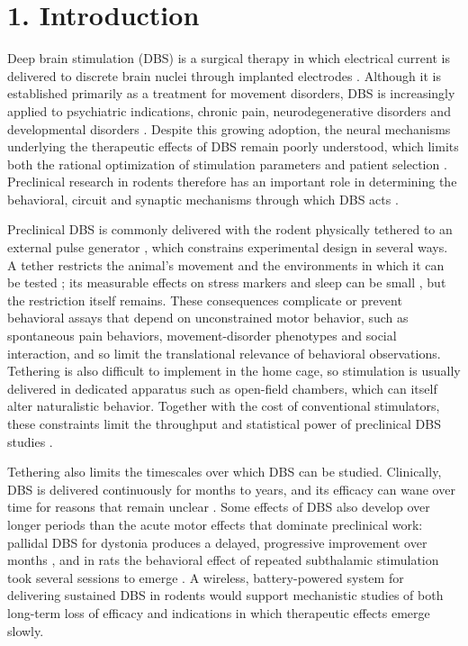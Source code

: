 \section{1. Introduction}\label{introduction}

Deep brain stimulation (DBS) is a surgical therapy in which electrical current is delivered to discrete brain nuclei through implanted electrodes \citep{lozano2019}. Although it is established primarily as a treatment for movement disorders, DBS is increasingly applied to psychiatric indications, chronic pain, neurodegenerative disorders and developmental disorders \citep{lozano2019,krauss2021,knotkova2021}. Despite this growing adoption, the neural mechanisms underlying the therapeutic effects of DBS remain poorly understood, which limits both the rational optimization of stimulation parameters and patient selection \citep{murphy2021}. Preclinical research in rodents therefore has an important role in determining the behavioral, circuit and synaptic mechanisms through which DBS acts \citep{creed2015,creed2018}.

Preclinical DBS is commonly delivered with the rodent physically tethered to an external pulse generator \citep{ewing2013}, which constrains experimental design in several ways. A tether restricts the animal's movement and the environments in which it can be tested \citep{jiang2017}; its measurable effects on stress markers and sleep can be small \citep{aulehner2022}, but the restriction itself remains. These consequences complicate or prevent behavioral assays that depend on unconstrained motor behavior, such as spontaneous pain behaviors, movement-disorder phenotypes and social interaction, and so limit the translational relevance of behavioral observations. Tethering is also difficult to implement in the home cage, so stimulation is usually delivered in dedicated apparatus such as open-field chambers, which can itself alter naturalistic behavior. Together with the cost of conventional stimulators, these constraints limit the throughput and statistical power of preclinical DBS studies \citep{ewing2013}.

Tethering also limits the timescales over which DBS can be studied. Clinically, DBS is delivered continuously for months to years, and its efficacy can wane over time for reasons that remain unclear \citep{fasano2019}. Some effects of DBS also develop over longer periods than the acute motor effects that dominate preclinical work: pallidal DBS for dystonia produces a delayed, progressive improvement over months \citep{kupsch2006}, and in rats the behavioral effect of repeated subthalamic stimulation took several sessions to emerge \citep{aleksandrova2013}. A wireless, battery-powered system for delivering sustained DBS in rodents would support mechanistic studies of both long-term loss of efficacy and indications in which therapeutic effects emerge slowly.


